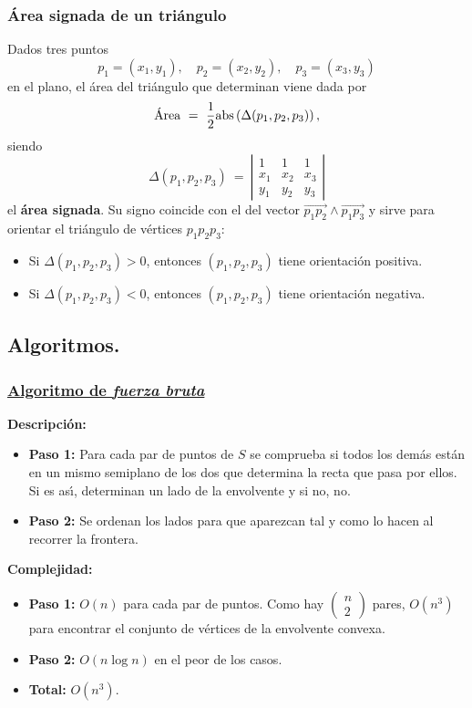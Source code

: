 \documentclass[twoside]{report}
\begin{document}
\subsubsection{\'Area signada de un tri\'angulo}

\noindent Dados tres puntos $$p_1=(x_1,y_1), \quad p_2=(x_2,y_2), \quad p_3=(x_3,y_3)$$ en el plano, el \'area del tri\'angulo que determinan viene dada por
$$\mbox{\'Area} \ = \ \frac{1}{2} {\rm abs}\left(\Delta(p_1,p_2,p_3)\right),$$
siendo $$\Delta(p_1,p_2,p_3) \ = \ \left| \begin{array}{ccc}
1 & 1 & 1 \\
x_1 & x_2 & x_3 \\
y_1 & y_2 & y_3
\end{array}
\right|$$
el \textbf{\'area signada}. Su signo coincide con el del vector $\overrightarrow{p_1p_2}\wedge\overrightarrow{p_1p_3}$ y sirve para orientar el tri\'angulo
de v\'ertices $p_1p_2p_3$:
\begin{itemize}
   \item Si $\Delta(p_1,p_2,p_3)>0$, entonces $(p_1,p_2,p_3)$ tiene orientaci\'on positiva.
   \item Si $\Delta(p_1,p_2,p_3)<0$, entonces $(p_1,p_2,p_3)$ tiene orientaci\'on negativa.
\end{itemize}

\subsection{Algoritmos.}

\subsubsection{\underline{Algoritmo de {\it \textbf{fuerza bruta}}}}

{\bf Descripci\'on:}

\begin{itemize}
  \item \textbf{Paso 1:} Para cada par de puntos de $S$ se comprueba si todos los
dem\'{a}s est\'{a}n en un mismo semiplano de los dos que determina la
recta que pasa por ellos. Si es as\'{\i}, determinan un lado de la
envolvente y si no, no.
  \item \textbf{Paso 2:} Se ordenan los lados para que aparezcan tal y
como lo hacen al recorrer la frontera.
\end{itemize}


{\bf Complejidad:}

\begin{itemize}
  \item \textbf{Paso 1:} $O(n)$ para cada par de puntos. Como hay
$\left(\begin{array}{c}n\\2\end{array}\right)$ pares, $O(n^3)$
para encontrar el conjunto de v\'{e}rtices de la envolvente convexa.
  \item \textbf{Paso 2:} $O(n\log n)$ en el peor de los casos.
  \item \textbf{Total:} $O(n^3)$.
\end{itemize}
\end{document}
